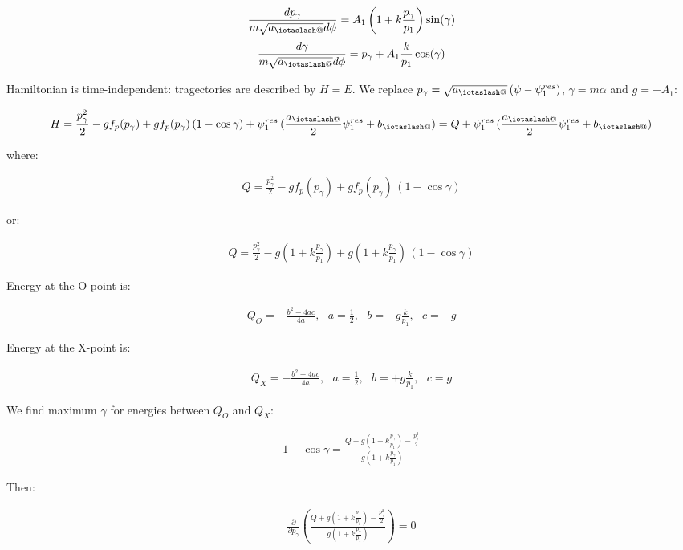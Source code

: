 \documentclass[11pt,a4paper,oneside]{article}
\makeatletter
\newcommand{\iotaslash}{{\mathpalette\iotaslash@\relax}}
\newcommand{\iotaslash@}[2]{
  \raisebox{-0.6\height}[0pt][0pt]{%
    \rotatebox[origin=Bl]{15}{$\m@th#1{\mkern-1mu\mathchar'26}$}%
  }%
  \mkern-9.5mu\nonscript\mkern-1mu
  \iota
  \mkern1mu
}
\makeatother
\begin{document}
\begin{align}
\frac{d p_\gamma}{m\sqrt{a_\iotaslash}d\phi}=A_1\left(1+k\frac{p_\gamma}{p_1}\right)\sin(\gamma)
\end{align}
\begin{align}
\frac{d \gamma}{m\sqrt{a_\iotaslash}d\phi}=p_\gamma+A_1\frac{k}{p_1}\cos(\gamma)
\end{align}

Hamiltonian is time-independent: tragectories are described by $H=E$. We replace $p_\gamma=\sqrt{a_\iotaslash}\,(\psi-\psi^{res}_1)$, $\gamma=m\alpha$ and $g=-A_1$:

\begin{align}
H=\frac{p_\gamma^2}{2}-gf_p(p_\gamma)+gf_p(p_\gamma)\,(1-\cos\gamma)+\psi^{res}_1\,(\frac{a_\iotaslash}{2}\psi^{res}_1+b_\iotaslash)=Q+\psi^{res}_1\,(\frac{a_\iotaslash}{2}\psi^{res}_1+b_\iotaslash)
\end{align}

where:

\begin{align}
Q=\frac{p_\gamma^2}{2}-gf_p(p_\gamma)+gf_p(p_\gamma)\,(1-\cos\gamma)
\end{align}

or:

\begin{align}
Q=\frac{p_\gamma^2}{2}-g\left(1+k\frac{p_\gamma}{p_1}\right)+g\left(1+k\frac{p_\gamma}{p_1}\right)\,(1-\cos\gamma)
\end{align}

Energy at the O-point is:

\begin{align}
Q_O=-\frac{b^2-4ac}{4a},\ \ \ a=\frac{1}{2},\ \ \ b=-g\frac{k}{p_1},\ \ \ c=-g
\end{align}

Energy at the X-point is:

\begin{align}
Q_X=-\frac{b^2-4ac}{4a},\ \ \ a=\frac{1}{2},\ \ \ b=+g\frac{k}{p_1},\ \ \ c=g
\end{align}

We find maximum $\gamma$ for energies between $Q_O$ and $Q_X$:

\begin{align}
1-\cos\gamma=\frac{Q+g\left(1+k\frac{p_\gamma}{p_1}\right)-\frac{p_\gamma^2}{2}}{g\left(1+k\frac{p_\gamma}{p_1}\right)}
\end{align}

Then:

\begin{align}
\frac{\partial}{\partial p_\gamma}\left(\frac{Q+g\left(1+k\frac{p_\gamma}{p_1}\right)-\frac{p_\gamma^2}{2}}{g\left(1+k\frac{p_\gamma}{p_1}\right)}\right)=0
\end{align}
\end{document}
